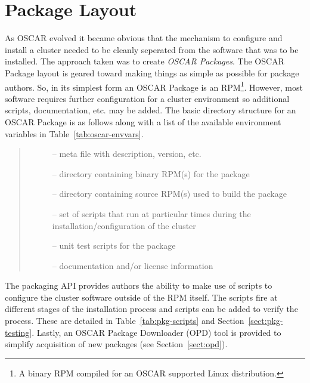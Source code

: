 
\section{Package Layout}
\label{sect:pkg-layout}

As OSCAR evolved it became obvious that the mechanism to configure and
install a cluster needed to be cleanly seperated from the software that was
to be installed.  The approach taken was to create \emph{OSCAR Packages}.
The OSCAR Package layout is geared toward making things as simple as
possible for package authors.  So, in its simplest form an OSCAR Package is
an RPM\footnote{A binary RPM compiled for an OSCAR supported Linux
distribution.}.  However, most software requires further configuration for
a cluster environment so additional scripts, documentation, etc. may be
added.  The basic directory structure for an OSCAR Package is as follows
along with a list of the available environment variables in 
Table~\ref{tab:oscar-envvars}.

\begin{quote}
\begin{description}
  \item[] -- meta file with description, version, etc.
  \item[] -- directory containing binary RPM(s) for the package
  \item[] -- directory containing source RPM(s) used to build
                            the package
  \item[] --  set of scripts that run at particular times
                     during the installation/configuration of the cluster
  \item[] -- unit test scripts for the package
  \item[] -- documentation and/or license information
\end{description}
\end{quote}



The packaging API provides authors the ability to make use of scripts to
configure the cluster software outside of the RPM itself.  The scripts fire
at different stages of the installation process and 
scripts can be added to verify the process.  These are detailed in
Table~\ref{tab:pkg-scripts} and Section~\ref{sect:pkg-testing}.  Lastly, an
OSCAR Package Downloader (OPD) tool is provided to simplify acquisition of
new packages (see Section~\ref{sect:opd}).




